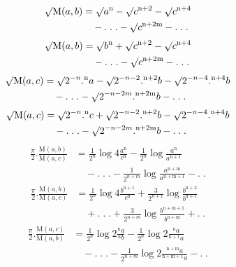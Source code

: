 \[
\begin{aligned}\surd\mathrm{M}(a,b)&=\surd a^{\mathrm{n}}-\surd c^{\mathrm{n}+2}-\surd c^{\mathrm{n}+4}\\&\quad-.\;.\;.-\surd c^{\mathrm{n}+2\mathrm{m}}-.\;.\;.\end{aligned}
\]
\[
\begin{aligned}\surd\mathrm{M}(a,b)&=\surd b^{\mathrm{n}}+\surd c^{\mathrm{n}+2}-\surd c^{\mathrm{n}+4}\\&\quad-.\;.\;.-\surd c^{\mathrm{n}+2\mathrm{m}}-.\;.\;.\end{aligned}
\]
\[
\begin{aligned}\surd\mathrm{M}(a,c)&=\surd2^{-n}.{}^{\mathrm{n}}a-\surd2^{-n-2}.{}^{\mathrm{n}+2}b-\surd2^{-n-4}.{}^{\mathrm{n}+4}b\\&\quad-.\;.\;.-\surd2^{-n-2m}.{}^{\mathrm{n}+2\mathrm{m}}b-.\;.\;.\end{aligned}
\]
\[
\begin{aligned}\surd\mathrm{M}(a,c)&=\surd2^{-n}.{}^{\mathrm{n}}c+\surd2^{-n-2}.{}^{\mathrm{n}+2}b-\surd2^{-n-4}.{}^{\mathrm{n}+4}b\\&\quad-.\;.\;.-\surd2^{-n-2m}.{}^{\mathrm{n}+2\mathrm{m}}b-.\;.\;.\end{aligned}
\]
\[
\begin{aligned}\displaystyle\frac\pi2.\frac{\mathrm{M}(a,b)}{\mathrm{M}(a,c)}&\displaystyle=\frac1{2^n}\log4\frac{a^{\mathrm{n}}}{c^{\mathrm{n}}}-\frac1{2^n}\log\frac{a^{\mathrm{n}}}{a^{\mathrm{n}+1}}\\&\quad-.\;.\;.-\frac1{2^{n+m}}\log\frac{a^{\mathrm{n}+\mathrm{m}}}{a^{\mathrm{n}+\mathrm{m}+1}}-.\;.\end{aligned}
\]
\[
\begin{aligned}\displaystyle\frac\pi2.\frac{\mathrm{M}(a,b)}{\mathrm{M}(a,c)}&\displaystyle=\frac1{2^n}\log4\frac{b^{\mathrm{n}+1}}{c^{\mathrm{n}}}+\frac3{2^{n+1}}\log\frac{b^{\mathrm{n}+2}}{b^{\mathrm{n}+1}}\\&\quad+.\;.\;.+\frac3{2^{n+m}}\log\frac{b^{\mathrm{n}+\mathrm{m}+1}}{b^{\mathrm{n}+\mathrm{m}}}+.\;.\end{aligned}
\]
\[
\begin{aligned}\displaystyle\frac\pi2.\frac{\mathrm{M}(a,c)}{\mathrm{M}(a,b)}&\displaystyle=\frac1{2^n}\log2\frac{{}^{\mathrm{n}}a}{{}^{\mathrm{n}}b}-\frac1{2^n}\log2\frac{{}^{\mathrm{n}}a}{{}^{\mathrm{n}+1}a}\\&\quad-.\;.\;.-\frac1{2^{n+m}}\log2\frac{{}^{\mathrm{n}+\mathrm{m}}a}{{}^{\mathrm{n}+\mathrm{m}+1}a}-.\;.\end{aligned}
\]
